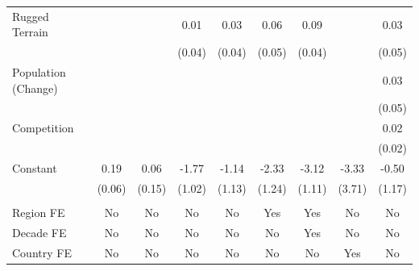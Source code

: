 \documentclass[12pt, letterpaper]{article}
\begin{document}
\begin{landscape}
\begin{table}[htbp]
\begin{small}
\begin{tabular}{l*{8}{c}}
Rugged Terrain      &                     &                     &        0.01         &        0.03         &        0.06         &        0.09\sym{**} &                     &        0.03         \\
                    &                     &                     &      (0.04)         &      (0.04)         &      (0.05)         &      (0.04)         &                     &      (0.05)         \\
Population (Change) &                     &                     &                     &                     &                     &                     &                     &        0.03         \\
                    &                     &                     &                     &                     &                     &                     &                     &      (0.05)         \\
Competition         &                     &                     &                     &                     &                     &                     &                     &        0.02         \\
                    &                     &                     &                     &                     &                     &                     &                     &      (0.02)         \\
Constant            &        0.19\sym{***}&        0.06         &       -1.77\sym{*}  &       -1.14         &       -2.33\sym{*}  &       -3.12\sym{***}&       -3.33         &       -0.50         \\
                    &      (0.06)         &      (0.15)         &      (1.02)         &      (1.13)         &      (1.24)         &      (1.11)         &      (3.71)         &      (1.17)         \\
\\
Region FE             &         No                &           No              &               No          &      No                    &      Yes               & Yes                     &         No            &      No         \\
Decade FE            &         No                &           No              &               No          &      No                    &      No               & Yes                     &         No            &      No         \\
Country FE          &         No                &           No              &               No          &      No                    &      No               & No                     &         Yes            &      No         \\

\end{tabular}
\end{small}
\end{table}
\end{landscape}
\end{document}
